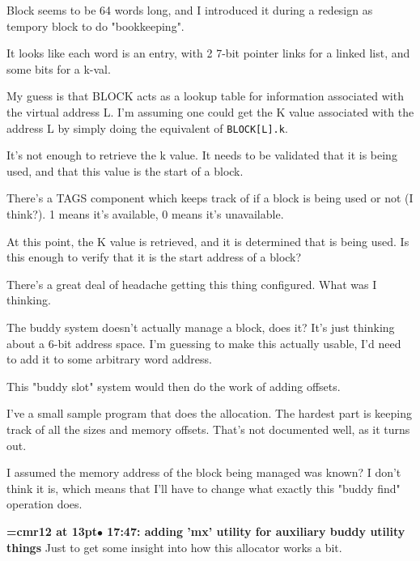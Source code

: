 Block seems to be 64 words long, and I introduced it during a redesign as tempory block to do "bookkeeping".
\par

It looks like each word is an entry, with 2 7-bit pointer links for a linked list, and some bits for a k-val.
\par

My guess is that BLOCK acts as a lookup table for information associated with the virtual address L. I'm assuming one could get the K value associated with the address L by simply doing the equivalent of {\tt BLOCK[L].k}.
\par

It's not enough to retrieve the k value. It needs to be validated that it is being used, and that this value is the start of a block.
\par

There's a TAGS component which keeps track of if a block is being used or not (I think?). 1 means it's available, 0 means it's unavailable.
\par

At this point, the K value is retrieved, and it is determined that is being used. Is this enough to verify that it is the start address of a block?
\par

There's a great deal of headache getting this thing configured. What was I thinking.
\par

The buddy system doesn't actually manage a block, does it? It's just thinking about a 6-bit address space. I'm guessing to make this actually usable, I'd need to add it to some arbitrary word address.
\par

This "buddy slot" system would then do the work of adding offsets.
\par

I've a small sample program that does the allocation. The hardest part is keeping track of all the sizes and memory offsets. That's not documented well, as it turns out.
\par

I assumed the memory address of the block being managed was known? I don't think it is, which means that I'll have to change what exactly this "buddy find" operation does.
\par

{\smallskip\noindent\bf\font\titlefont=cmr12 at 13pt\titlefont $\bullet$ 17:47: adding 'mx' utility for auxiliary buddy utility things}\smallskip
Just to get some insight into how this allocator works a bit.
\par

